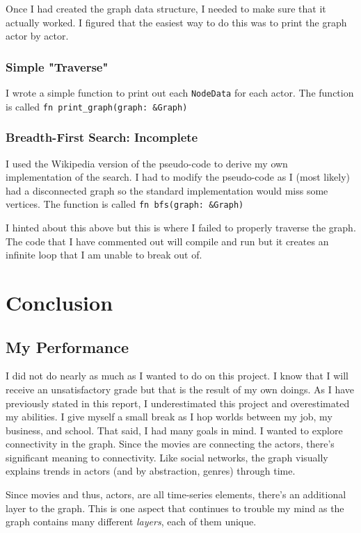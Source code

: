 \documentclass[12pt,letterpaper]{article}
\begin{document}
Once I had created the graph data structure, I needed to make sure that it actually worked.  I figured that the easiest way to do this was to print the graph actor by actor. 

\subsubsection{Simple "Traverse"}

I wrote a simple function to print out each \texttt{NodeData} for each actor.  The function is called \texttt{fn print\_graph(graph: \&Graph)}

\subsubsection{Breadth-First Search: Incomplete}

I used the Wikipedia version of the pseudo-code to derive my own implementation of the search. I had to modify the pseudo-code as I (most likely) had a disconnected graph so the standard implementation would miss some vertices.  The function is called \texttt{fn bfs(graph: \&Graph)}

I hinted about this above but this is where I failed to properly traverse the graph. The code that I have commented out will compile and run but it creates an infinite loop that I am unable to break out of. 

\section{Conclusion}

\subsection{My Performance}

I did not do nearly as much as I wanted to do on this project.  I know that I will receive an unsatisfactory grade but that is the result of my own doings.  As I have previously stated in this report,  I underestimated this project and overestimated my abilities.  I give myself a small break as I hop worlds between my job, my business, and school.  That said, I had many goals in mind. I wanted to explore connectivity in the graph. Since the movies are connecting the actors, there's significant meaning to connectivity. Like social networks,  the graph visually explains trends in actors (and by abstraction, genres) through time. 

Since movies and thus, actors, are all time-series elements, there's an additional layer to the graph.  This is one aspect that continues to trouble my mind as the graph contains many different \textit{layers}, each of them unique.  
\end{document}
